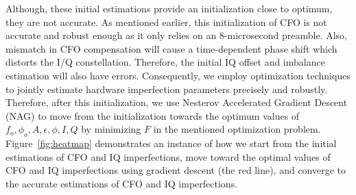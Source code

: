 Although, these initial estimations provide an initialization close to optimum,
they are not accurate. As mentioned earlier, this initialization of CFO
is not accurate and robust enough as it only relies on an 8-microsecond
preamble. Also, mismatch in CFO compensation will cause a time-dependent phase
shift which distorts the I/Q constellation. Therefore, the initial IQ offset
and imbalance estimation will also have errors. Consequently, we employ
optimization techniques to jointly estimate hardware imperfection parameters
precisely and robustly. Therefore, after this initialization, we use Nesterov
Accelerated Gradient Descent (NAG) to move from the initialization towards the optimum values
of $f_o,\phi_o,A,\epsilon,\phi,I,Q$ by minimizing $F$ in the mentioned
optimization problem. Figure~\ref{fig:heatmap} demonstrates an instance of how we start from the initial estimations of CFO and IQ imperfections, move toward the optimal values of CFO and IQ imperfections using gradient descent (the red line), and converge to the accurate estimations of CFO and IQ imperfections.

